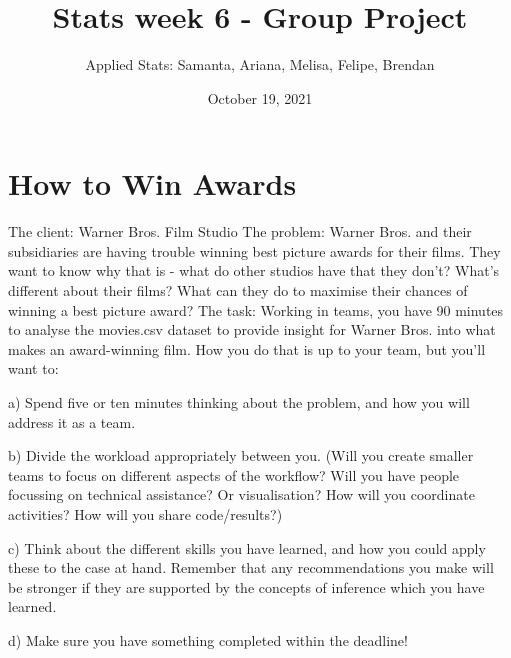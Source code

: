 \documentclass[12pt,letterpaper]{article}
\title{Stats week 6 - Group Project}
\date{October 19, 2021}
\author{Applied Stats: Samanta, Ariana, Melisa, Felipe, Brendan}
\begin{document}
	\maketitle
	
	\section*{How to Win Awards}

	
	The client: Warner Bros. Film Studio
	The problem: Warner Bros. and their subsidiaries are having trouble winning best picture awards for their films. They want to know why that is - what do other studios have that they don't? What's different about their films? What can they do to maximise their chances of winning a best picture award?
	The task: Working in teams, you have 90 minutes to analyse the movies.csv dataset to provide insight for Warner Bros. into what makes an award-winning film. How you do that is up to your team, but you'll want to:
	\item a) Spend five or ten minutes thinking about the problem, and how you will address it as a team.
	
	\item b) Divide the workload appropriately between you. (Will you create smaller teams to focus on different aspects of the workflow? Will you have people focussing on technical assistance? Or visualisation? How will you coordinate activities? How will you share code/results?)
	
    \item c) Think about the different skills you have learned, and how you could apply these to the case at hand. Remember that any recommendations you make will be stronger if they are supported by the concepts of inference which you have learned.
    
	\item d) Make sure you have something completed within the deadline!

	  
	
	\vspace{1cm}
\newpage
\end{document}
